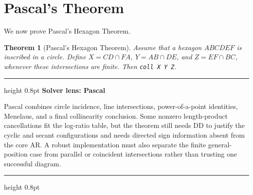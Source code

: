 \documentclass[reqno]{amsart}
\newenvironment{lecturebox}[1]{%
    \par\medskip
    \noindent\begingroup
    \setlength{\parindent}{0pt}
    \color{agblue}\hrule height 0.8pt\color{black}
    \smallskip
    \textbf{\color{agblue}#1}\par\smallskip
}{%
    \smallskip
    \color{agblue}\hrule height 0.8pt\color{black}
    \endgroup
    \medskip
}
\DeclareMathOperator{\1}{\textbf{1}}
\newtheorem{thm}{Theorem}[section]
\begin{document}
\section{Pascal's Theorem}\label{sec: Pascal}

We now prove Pascal's Hexagon Theorem.

\begin{thm}[Pascal's Hexagon Theorem]
Assume that a hexagon $ABCDEF$ is inscribed in a circle. Define
$X=CD\cap FA$, $Y=AB\cap DE$, and $Z=EF\cap BC$, whenever these intersections
are finite. Then \verb|coll X Y Z|.
\end{thm}

\begin{lecturebox}{Solver lens: Pascal}
Pascal combines circle incidence, line intersections, power-of-a-point
identities, Menelaus, and a final collinearity conclusion. Some nonzero
length-product cancellations fit the log-ratio table, but the theorem still
needs DD to justify the cyclic and secant configurations and needs directed
sign information absent from the core AR. A robust implementation must also
separate the finite general-position case from parallel or coincident
intersections rather than trusting one successful diagram.
\end{lecturebox}
\end{document}

